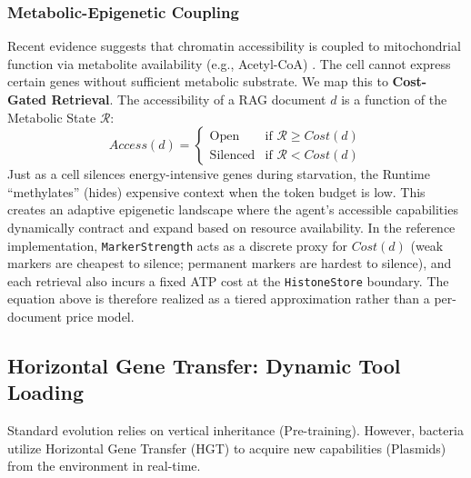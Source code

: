 \subsubsection{Metabolic-Epigenetic Coupling}

Recent evidence suggests that chromatin accessibility is coupled to mitochondrial function via metabolite
availability (e.g., Acetyl-CoA) \cite{chandel2024mitochondria}. The cell cannot express certain genes without
sufficient metabolic substrate. We map this to \textbf{Cost-Gated Retrieval}. The accessibility of a RAG
document $d$ is a function of the Metabolic State $\mathcal{R}$:
\begin{equation}
Access(d) =
\begin{cases}
  \text{Open} & \text{if } \mathcal{R} \ge Cost(d) \\
  \text{Silenced} & \text{if } \mathcal{R} < Cost(d)
\end{cases}
\label{eq:cost-gated-retrieval}
\end{equation}
Just as a cell silences energy-intensive genes during starvation, the Runtime ``methylates'' (hides) expensive
context when the token budget is low. This creates an adaptive epigenetic landscape where the agent's accessible
capabilities dynamically contract and expand based on resource availability. In the reference implementation,
\texttt{MarkerStrength} acts as a discrete proxy for $Cost(d)$ (weak markers are cheapest to silence; permanent
markers are hardest to silence), and each retrieval also incurs a fixed ATP cost at the \texttt{HistoneStore}
boundary. The equation above is therefore realized as a tiered approximation rather than a per-document price model.

\subsection{Horizontal Gene Transfer: Dynamic Tool Loading}
\label{sec:hgt}

Standard evolution relies on vertical inheritance (Pre-training). However, bacteria utilize Horizontal Gene
Transfer (HGT) to acquire new capabilities (Plasmids) from the environment in real-time.

